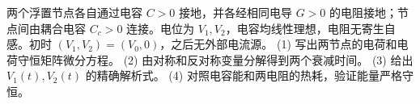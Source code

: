 两个浮置节点各自通过电容 \(C>0\) 接地，并各经相同电导 \(G>0\) 的电阻接地；节点间由耦合电容 \(C_c>0\) 连接。电位为 \(V_1,V_2\)，电容均线性理想，电阻无寄生自感。初时 \((V_1,V_2)=(V_0,0)\)，之后无外部电流源。
(1) 写出两节点的电荷和电荷守恒矩阵微分方程。
(2) 由对称和反对称变量分解得到两个衰减时间。
(3) 给出 \(V_1(t),V_2(t)\) 的精确解析式。
(4) 对照电容能和两电阻的热耗，验证能量严格守恒。

